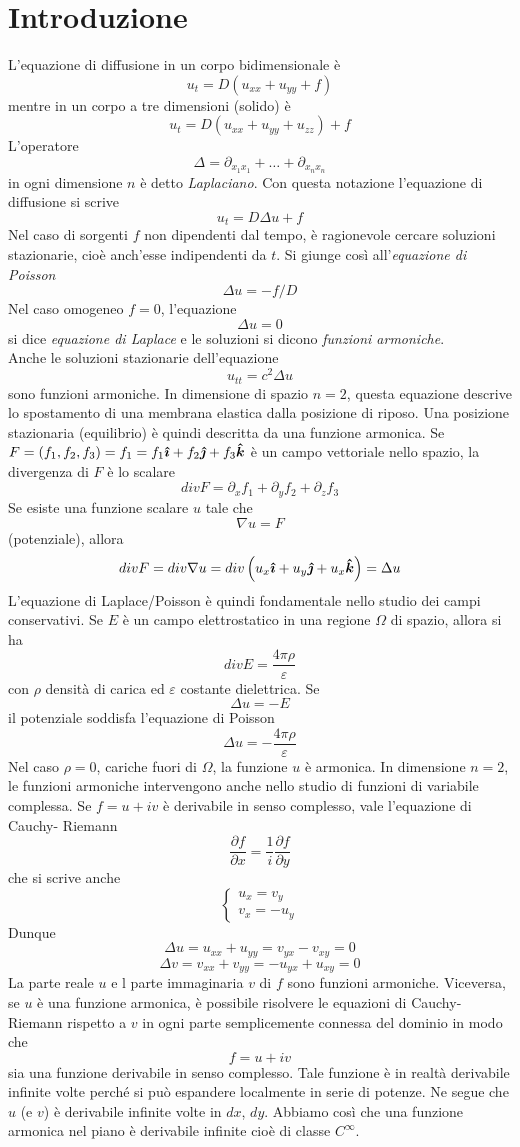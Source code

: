 \section{Introduzione}
L'equazione di diffusione in un corpo bidimensionale \`e
\[
	u_t= D(u_{xx}+ u_{yy} +f)
\]
mentre in un corpo a tre dimensioni (solido) \`e
\[
	u_t=D\left( u_{xx}+u_{yy} +u_{zz} \right) +f
\]
L'operatore
\[
	\Delta= \partial_{x_1x_1}+ \ldots + \partial_{x_n x_n}
\]
in ogni dimensione $n$ \`e detto \textit{Laplaciano}. Con questa notazione
l'equazione di diffusione si scrive
\[
	u_t= D\Delta u +f
\]
Nel caso di sorgenti $f$ non dipendenti dal tempo, \`e ragionevole cercare
soluzioni stazionarie, cio\`e anch'esse indipendenti da $t$.
Si giunge cos\`i all'\textit{equazione di Poisson}
\[
	\Delta u= -f/D
\]
Nel caso omogeneo $f=0$, l'equazione
\[
	\Delta u=0
\]
si dice \textit{equazione di Laplace} e le soluzioni si dicono
\textit{funzioni armoniche}.\\
Anche le soluzioni stazionarie dell'equazione
\[
	u_{tt}= c^2 \Delta u
\]
sono funzioni armoniche. In dimensione di spazio $n=2$, questa equazione
descrive lo spostamento di una membrana elastica dalla posizione di riposo.
Una posizione stazionaria (equilibrio) \`e quindi descritta da una funzione
armonica.
Se $F=(f_1,f_2, f_3)=f_1= f_1 \boldsymbol{\hat{\imath}} + f_2 \boldsymbol{\hat{\jmath}} + f_3 \boldsymbol{\hat{k}}$ \`e un campo
vettoriale nello spazio, la divergenza di $F$ \`e lo scalare
\[
	div F= \partial_x f_1 + \partial_y f_2 + \partial_z f_3
\]
Se esiste una funzione scalare $u$ tale che
\[
	\nabla u= F
\]
(potenziale), allora
\[
	div F= div \nabla u = div \left( u_x \boldsymbol{\hat{\imath}} +u_y \boldsymbol{\hat{\jmath}} + u_x \boldsymbol{\hat{k}} \right)
	=\Delta u
\]
L'equazione di Laplace/Poisson \`e quindi fondamentale nello studio dei campi
conservativi. Se $E$ \`e un campo elettrostatico in una regione $\Omega$
di spazio, allora si ha
\[
	div E= \frac{4 \pi \rho}{\varepsilon}
\]
con $\rho$ densit\`a di carica ed $\varepsilon$ costante dielettrica. Se
\[
	\Delta u= -E
\]
il potenziale soddisfa l'equazione di Poisson
\[
	\Delta u= - \frac{4 \pi \rho}{\varepsilon}
\]
Nel caso $\rho=0$, cariche fuori di $\Omega$, la funzione $u$ \`e armonica.
In dimensione $n=2$, le funzioni armoniche intervengono anche nello studio
di funzioni di variabile complessa.
Se $f= u+iv$ \`e derivabile in senso complesso, vale l'equazione di
Cauchy- Riemann
\[
	\frac{\partial f}{\partial x}= \frac{1}{i} \frac{\partial f}
	{\partial y}
\]
che si scrive anche
\[
	\left\{
	\begin{array}{l}
		u_x=v_y \\
		v_x=- u_y
	\end{array}
	\right.
\]
Dunque
\[
	\Delta u= u_{xx}+ u_{yy}= v_{yx}-v_{xy}=0
\]
\[
	\Delta v= v_{xx}+ v_{yy}= -u_{yx} +u_{xy}=0
\]
La parte reale $u$ e l parte immaginaria $v$ di $f$ sono funzioni
armoniche.
Viceversa, se $u$ \`e una funzione armonica, \`e possibile risolvere le
equazioni di Cauchy-Riemann rispetto a $v$ in ogni parte semplicemente connessa
del dominio in modo che
\[
	f= u+ iv
\]
sia una funzione derivabile in senso complesso.
Tale funzione \`e in realt\`a derivabile infinite volte perch\'e si pu\`o
espandere localmente in serie di potenze. Ne segue che $u$ (e $v$) \`e
derivabile infinite volte in $dx$, $dy$.
Abbiamo cos\`i che una funzione armonica nel piano \`e derivabile infinite
cio\`e di classe $C^{\infty}$.
